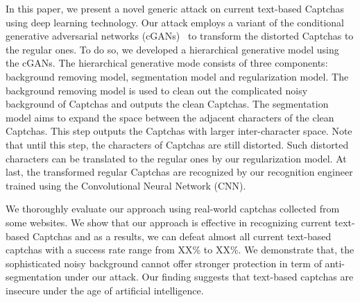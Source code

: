 In this paper, we present a novel generic attack on current text-based Captchas using deep learning technology. Our attack employs a variant of the conditional generative adversarial networks (cGANs)~\cite{pix2pix2016} to transform the distorted Captchas to the regular ones.
To do so, we developed a hierarchical generative model using the cGANs. The hierarchical generative mode consists of three components: background removing model, segmentation model and regularization model.
The background removing model is used to clean out the complicated noisy background of Captchas and outputs the clean Captchas. The segmentation model aims to expand the space between the adjacent characters of the clean Captchas. This step outputs the Captchas with larger inter-character space. Note that until this step, the characters of Captchas are still distorted. Such distorted characters can be translated to the regular ones by our regularization model. 
At last, the transformed regular Captchas are recognized by our recognition engineer trained using the Convolutional Neural Network (CNN).

We thoroughly evaluate our approach using real-world captchas collected from some websites. We show that our approach is effective in recognizing current text-based Captchas and as a results, we can defeat almost all current text-based captchas with a success rate range from XX\% to XX\%. We demonstrate that, the sophisticated noisy background cannot offer stronger protection in term of anti-segmentation under our attack. Our finding suggests that text-based captchas are insecure under the age of artificial intelligence.

